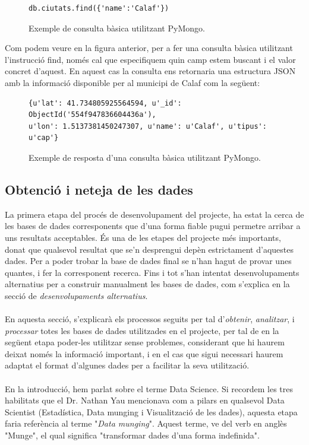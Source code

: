\documentclass[12pt,a4paper,openright,oneside]{article}
\numberwithin{equation}{section}
\theoremstyle{definition}
\begin{document}
\begin{figure}[htbp]
\begin{verbatim}
db.ciutats.find({'name':'Calaf'})
\end{verbatim}
\caption{Exemple de consulta bàsica utilitzant PyMongo.}
\end{figure}
Com podem veure en la figura anterior, per a fer una consulta bàsica utilitzant l'instrucció find, només cal que especifiquem quin camp estem buscant i el valor concret d'aquest. En aquest cas la consulta ens retornaria una estructura JSON amb la informació disponible per al municipi de Calaf com la següent:
\begin{figure}[!htbp]
\begin{verbatim}
{u'lat': 41.734805925564594, u'_id': ObjectId('554f947836604436a'), 
u'lon': 1.5137381450247307, u'name': u'Calaf', u'tipus': u'cap'}
\end{verbatim}
\caption{Exemple de resposta d'una consulta bàsica utilitzant PyMongo.}
\end{figure}
\newpage
\subsection{Obtenció i neteja de les dades}
La primera etapa del procés de desenvolupament del projecte, ha estat la cerca de les bases de dades corresponents que d'una forma fiable pugui permetre arribar a uns resultats acceptables. És una de les etapes del projecte més importants, donat que qualsevol resultat que se'n desprengui depèn estrictament d'aquestes dades. Per a poder trobar la base de dades final se n'han hagut de provar unes quantes, i fer la corresponent recerca. Fins i tot s'han intentat desenvolupaments alternatius per a construir manualment les bases de dades, com s'explica en la secció de \textit{desenvolupaments alternatius}.\\ \\
En aquesta secció, s'explicarà els processos seguits per tal d'\emph{obtenir}, \emph{analitzar}, i \emph{processar} totes les bases de dades utilitzades en el projecte, per tal de en la següent etapa poder-les utilitzar sense problemes, considerant que hi haurem deixat només la informació important, i en el cas que sigui necessari haurem adaptat el format d'algunes dades per a facilitar la seva utilització.\\ \\
En la introducció, hem parlat sobre el terme Data Science. Si recordem les tres habilitats que el Dr. Nathan Yau mencionava com a pilars en qualsevol Data Scientist (Estadística, Data munging i Visualització de les dades), aquesta etapa faria referència al terme "\emph{Data munging}". Aquest terme, ve del verb en anglès "Munge", el qual significa "transformar dades d'una forma indefinida".
\end{document}
